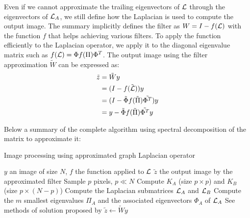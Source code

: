 \ifthesis
 Even if we cannot approximate the trailing eigenvectors of \(\operatorname{\mathcal{L}}\) through the eigenvectors of \(\operatorname{\mathcal{L}}_A\), we still define how the Laplacian is used to compute the output image.
 The summary \cite{modern_tour_2013} implicitly defines the filter as \(W = I - f(\operatorname{\mathcal{L}})\) with the function \(f\) that helps achieving various filters.
 To apply the function efficiently to the Laplacian operator, we apply it to the diagonal eigenvalue matrix such as \(f(\operatorname{\mathcal{L}}) = \Phi f(\Pi) \Phi^T\).
 The output image using the filter approximation \(\tilde{W}\) can be expressed as:
 \begin{equation}
  \begin{split}
      \tilde{z} & = \tilde{W}y \\
                & = (I - f(\tilde{\operatorname{\mathcal{L}}})) y \\
                & = (I - \tilde{\Phi} f(\tilde{\Pi}) \tilde{\Phi^T}) y \\
                & = y - \tilde{\Phi} f(\tilde{\Pi}) \tilde{\Phi^T} y
  \end{split}
 \end{equation}
\fi

Below a summary of the complete algorithm using spectral decomposition of the matrix to approximate it:

\begin{algorithm}[H]
 \caption{Image processing using approximated graph Laplacian operator}
 \begin{algorithmic}
  \REQUIRE \(y\) an image of size \(N\), \(f\) the function applied to \(\operatorname{\mathcal{L}}\)
  \ENSURE \(\tilde{z}\) the output image by the approximated filter
  \STATE {}
  \STATE Sample \(p\) pixels, \(p \ll N\)
  \STATE {}
  \STATE Compute \(K_A\) (size \(p \times p\)) and \(K_B\) (size \(p \times (N-p)\))
  \STATE Compute the Laplacian submatrices \(\operatorname{\mathcal{L}}_A\) and \(\operatorname{\mathcal{L}}_B\)
  \STATE {}
  \STATE Compute the \(m\) smallest eigenvalues \(\Pi_A\) and the associated eigenvectors \(\Phi_A\) of \(\operatorname{\mathcal{L}}_A\)
  \STATE {}
  \STATE See methods of solution proposed by \cite{fowlkes_spectral_2004}
  \STATE \(\tilde{z} \leftarrow \tilde{W} y\)
 \end{algorithmic}
\end{algorithm}
